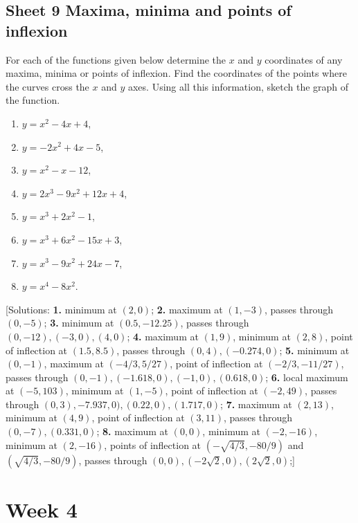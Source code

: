 \documentclass[
  11pt,
  oneside]{book}
\providecommand{\tightlist}{%
  \setlength{\itemsep}{0pt}\setlength{\parskip}{0pt}}
\newcommand{\slide}{}
\theoremstyle{definition}
\theoremstyle{definition}
\theoremstyle{definition}
\theoremstyle{definition}
\theoremstyle{remark}
\begin{document}
\slide

\section{Sheet 9 Maxima, minima and points of inflexion}\label{sheet-9-maxima-minima-and-points-of-inflexion}

For each of the functions given below determine the \(x\) and \(y\) coordinates of any maxima, minima or points of inflexion. Find the coordinates of the points where the curves cross the \(x\) and \(y\) axes. Using all this information, sketch the graph of the function.

\begin{enumerate}
\def\labelenumi{\arabic{enumi}.}
\tightlist
\item
  \(y=x^2-4x+4\),
\item
  \(y=-2x^2+4x-5\),
\item
  \(y=x^2-x-12\),
\item
  \(y=2x^3-9x^2+12x+4\),
\item
  \(y=x^3+2x^2-1\),
\item
  \(y=x^3+6x^2-15x+3\),
\item
  \(y=x^3-9x^2+24x-7\),
\item
  \(y=x^4-8x^2\).
\end{enumerate}

{[}Solutions:
\textbf{1.} minimum at \((2,0)\);
\textbf{2.} maximum at \((1,-3)\), passes through \((0,-5)\);
\textbf{3.} minimum at \((0.5,-12.25)\), passes through \((0,-12), (-3,0), (4,0)\);
\textbf{4.} maximum at \((1,9)\), minimum at \((2,8)\), point of inflection at \((1.5,8.5)\), passes through \((0,4), (-0.274,0)\);
\textbf{5.} minimum at \((0,-1)\), maximum at \((-4/3,5/27)\), point of inflection at \((-2/3,-11/27)\), passes through \((0,-1), (-1.618,0), (-1,0), (0.618,0)\);
\textbf{6.} local maximum at \((-5,103)\), minimum at \((1,-5)\), point of inflection at \((-2,49)\), passes through \((0,3), -7.937,0), (0.22,0), (1.717,0)\);
\textbf{7.} maximum at \((2,13)\), minimum at \((4,9)\), point of inflection at \((3,11)\), passes through \((0,-7), (0.331,0)\);
\textbf{8.} maximum at \((0,0)\), minimum at \((-2,-16)\), minimum at \((2,-16)\), points of inflection at \((-\sqrt{4/3},-80/9)\) and \((\sqrt{4/3},-80/9)\), passes through \((0,0), (-2\sqrt{2},0), (2\sqrt{2},0)\);{]}

\chapter{Week 4}\label{week-four}
\end{document}
